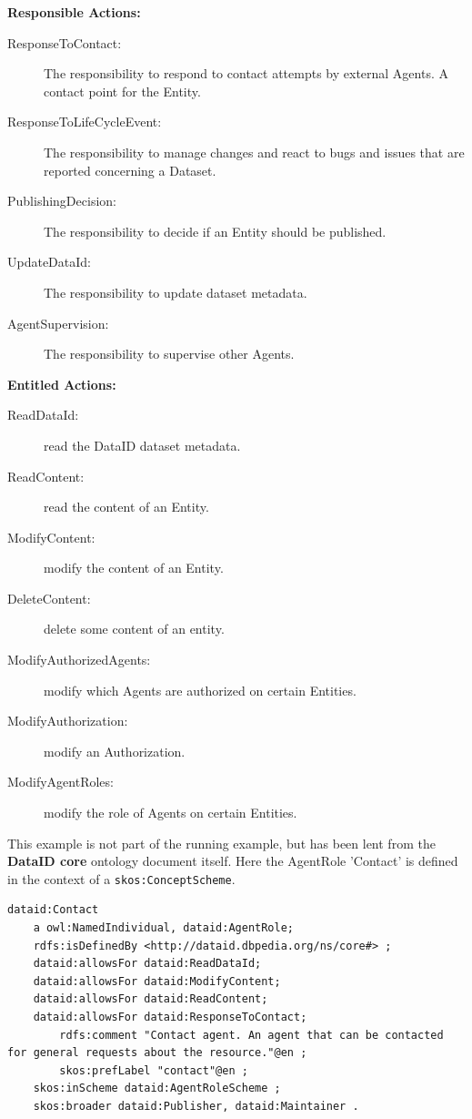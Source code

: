 \documentclass[a4paper,english,twoside,BCOR1.5cm,headsepline,DIV12,appendixprefix,final,12pt]{scrbook}
\newcommand{\core}{{\ttfamily\bfseries DataID core}\xspace}
\newcommand{\prop}[1]{{{\texttt{#1}}}}
\begin{document}
{\large\textbf{Responsible Actions:}}
\begin{description}
\item[ResponseToContact:] The responsibility to respond to contact attempts by external Agents. A contact point for the Entity.
\item[ResponseToLifeCycleEvent:] The responsibility to manage changes and react to bugs and issues that are reported concerning a Dataset.
\item[PublishingDecision:] The responsibility to decide if an Entity should be published.
\item[UpdateDataId:] The responsibility to update dataset metadata.
\item[AgentSupervision:] The responsibility to supervise other Agents.\\
\end{description}

{\large\textbf{Entitled Actions:}}
\begin{description}
\item[ReadDataId:] read the DataID dataset metadata.
\item[ReadContent:] read the content of an Entity.
\item[ModifyContent:] modify the content of an Entity.
\item[DeleteContent:] delete some content of an entity.
\item[ModifyAuthorizedAgents:] modify which Agents are authorized on certain Entities.
\item[ModifyAuthorization:] modify an Authorization.
\item[ModifyAgentRoles:] modify the role of Agents on certain Entities.
\end{description}

This example is not part of the running example, but has been lent from the \core ontology document itself. Here the AgentRole 'Contact' is defined in the context of a \prop{skos:ConceptScheme}.
\\
\begin{lstlisting}[language=ttl, captionpos=b,caption=Example of an organisation,label=lst:coresuperset,linewidth=\columnwidth,breaklines=true]
dataid:Contact
	a owl:NamedIndividual, dataid:AgentRole;
	rdfs:isDefinedBy <http://dataid.dbpedia.org/ns/core#> ;
	dataid:allowsFor dataid:ReadDataId; 
	dataid:allowsFor dataid:ModifyContent;
	dataid:allowsFor dataid:ReadContent;
	dataid:allowsFor dataid:ResponseToContact;
        rdfs:comment "Contact agent. An agent that can be contacted for general requests about the resource."@en ;
        skos:prefLabel "contact"@en ;
	skos:inScheme dataid:AgentRoleScheme ; 
	skos:broader dataid:Publisher, dataid:Maintainer .   
\end{lstlisting}
\end{document}
